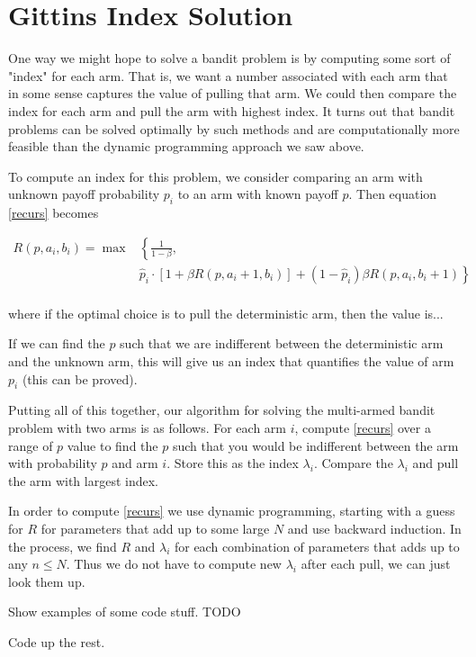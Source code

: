 \section*{Gittins Index Solution}
One way we might hope to solve a bandit problem is by computing some sort of "index" for each arm.  That is, we want a number associated with each arm that in some sense captures the value of pulling that arm.  We could then compare the index for each arm and pull the arm with highest index.  It turns out that bandit problems can be solved optimally by such methods and are computationally more feasible than the dynamic programming approach we saw above.

To compute an index for this problem, we consider comparing an arm with unknown payoff probability $p_i$ to an arm with known payoff $p$.  Then equation \eqref{recurs} becomes

\begin{align}\label{recurs}
R(p,a_i,b_i) = \max&\left\{\frac{1}{1-\beta} \right. ,\\
&  \left.\hat{p}_i\cdot[1 + \beta R(p,a_i+1,b_i)] + (1-\hat{p}_i)\beta R(p, a_i,b_i+1)\right\}\\
\end{align}

where if the optimal choice is to pull the deterministic arm, then the value is...

If we can find the $p$ such that we are indifferent between the deterministic arm and the unknown arm, this will give us an index that quantifies the value of arm $p_i$ (this can be proved). 

Putting all of this together, our algorithm for solving the multi-armed bandit problem with two arms is as follows.  For each arm $i$, compute \eqref{recurs} over a range of $p$ value to find the $p$ such that you would be indifferent between the arm with probability $p$ and arm $i$. Store this as the index $\lambda_i$.  Compare the $\lambda_i$ and pull the arm with largest index.

In order to compute \eqref{recurs} we use dynamic programming, starting with a guess for $R$ for parameters that add up to some large $N$ and use backward induction.  In the process, we find $R$ and $\lambda_i$ for each combination of parameters that adds up to any $n\leq N$. Thus we do not have to compute new $\lambda_i$ after each pull, we can just look them up.

Show examples of some code stuff.  TODO
\begin{problem}
Code up the rest.
\end{problem} 